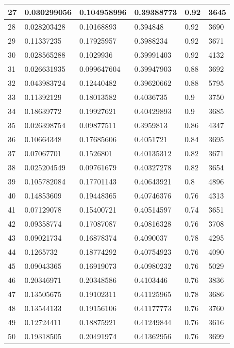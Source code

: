 \begin{longtable}{|l|l|l|l|l|l|}
27 & 0.030299056 & 0.104958996 & 0.39388773 & 0.92 & 3645 \\ \hline 
28 & 0.028203428 & 0.10168893 & 0.394848 & 0.92 & 3690 \\ \hline 
29 & 0.11337235 & 0.17925957 & 0.3988234 & 0.92 & 3671 \\ \hline 
30 & 0.028565288 & 0.1029936 & 0.39991403 & 0.92 & 4132 \\ \hline 
31 & 0.026631935 & 0.099647604 & 0.39947903 & 0.88 & 3692 \\ \hline 
32 & 0.043983724 & 0.12440482 & 0.39620662 & 0.88 & 5795 \\ \hline 
33 & 0.11392129 & 0.18013582 & 0.4036735 & 0.9 & 3750 \\ \hline 
34 & 0.18639772 & 0.19927621 & 0.40429893 & 0.9 & 3685 \\ \hline 
35 & 0.026398754 & 0.09877511 & 0.3959813 & 0.86 & 4347 \\ \hline 
36 & 0.10664348 & 0.17685606 & 0.4051721 & 0.84 & 3695 \\ \hline 
37 & 0.07067701 & 0.1526801 & 0.40135312 & 0.82 & 3671 \\ \hline 
38 & 0.025204549 & 0.09761679 & 0.40327278 & 0.82 & 3654 \\ \hline 
39 & 0.105782084 & 0.17701143 & 0.40643921 & 0.8 & 4896 \\ \hline 
40 & 0.14853609 & 0.19448365 & 0.40746376 & 0.76 & 4313 \\ \hline 
41 & 0.07129078 & 0.15400721 & 0.40514597 & 0.74 & 3651 \\ \hline 
42 & 0.09358774 & 0.17087087 & 0.40816328 & 0.76 & 3708 \\ \hline 
43 & 0.09021734 & 0.16878374 & 0.4090037 & 0.78 & 4295 \\ \hline 
44 & 0.1265732 & 0.18774292 & 0.40754923 & 0.76 & 4090 \\ \hline 
45 & 0.09043365 & 0.16919073 & 0.40980232 & 0.76 & 5029 \\ \hline 
46 & 0.20346971 & 0.20348586 & 0.4103446 & 0.76 & 3836 \\ \hline 
47 & 0.13505675 & 0.19102311 & 0.41125965 & 0.78 & 3686 \\ \hline 
48 & 0.13544133 & 0.19156106 & 0.41177773 & 0.76 & 3760 \\ \hline 
49 & 0.12724411 & 0.18875921 & 0.41249844 & 0.76 & 3616 \\ \hline 
50 & 0.19318505 & 0.20491974 & 0.41362956 & 0.76 & 3699 \\ \hline 
\end{longtable}